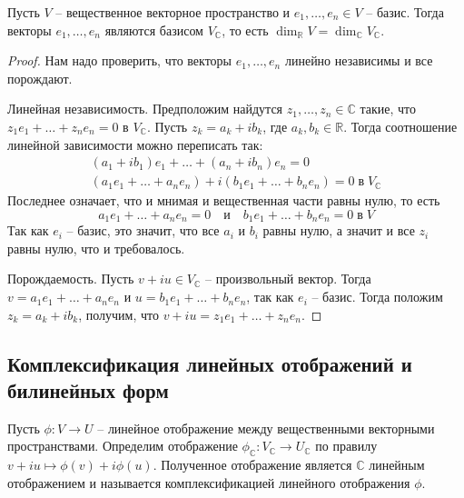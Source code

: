 \begin{claim}\label{claim::ComplfixBasis}
Пусть $V$ -- вещественное векторное пространство и $e_1,\ldots,e_n\in V$ -- базис. Тогда векторы $e_1,\ldots,e_n$ являются базисом $V_\mathbb C$, то есть $\dim_\mathbb R V = \dim_\mathbb C V_\mathbb C$.
\end{claim}
\begin{proof}
Нам надо проверить, что векторы $e_1,\ldots,e_n$ линейно независимы и все порождают. 

Линейная независимость. Предположим найдутся $z_1,\ldots,z_n\in \mathbb C$ такие, что $z_1 e_1+ \ldots+ z_n e_n = 0$ в $V_\mathbb C$. Пусть $z_k = a_k + i b_k$, где $a_k,b_k \in \mathbb R$. Тогда соотношение линейной зависимости можно переписать так:
\begin{gather*}
(a_1+ib_1)e_1 + \ldots + (a_n + i b_n)e_n = 0\\
(a_1 e_1 + \ldots + a_n e_n) + i(b_1 e_1 + \ldots + b_n e_n) = 0\;\text{в}\; V_\mathbb C
\end{gather*}
Последнее означает, что и мнимая и вещественная части равны нулю, то есть
\[
a_1 e_1 + \ldots + a_n e_n = 0\quad \text{и}\quad b_1 e_1 + \ldots + b_n e_n = 0\;\text{в}\; V
\]
Так как $e_i$ -- базис, это значит, что все $a_i$ и $b_i$ равны нулю, а значит и все $z_i$ равны нулю, что и требовалось.

Порождаемость. Пусть $v + i u\in V_\mathbb C$ -- произвольный вектор. Тогда $v = a_1e_1+\ldots + a_n e_n$ и $u = b_1 e_1 + \ldots + b_n e_n$, так как $e_i$ -- базис. Тогда положим $z_k = a_k + i b_k$, получим, что $v + iu = z_1 e_1 + \ldots + z_n e_n$.
\end{proof}

\subsection{Комплексификация линейных отображений и билинейных форм}\label{subsection::complexification}

\begin{definition}
Пусть $\phi\colon V\to U$ -- линейное отображение между вещественными векторными пространствами. Определим отображение $\phi_\mathbb C\colon V_\mathbb C\to U_\mathbb C$ по правилу $v+iu \mapsto \phi(v) + i\phi(u)$. Полученное отображение является $\mathbb C$ линейным отображением и называется комплексификацией линейного отображения $\phi$.
\end{definition}

